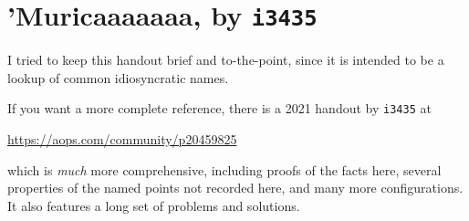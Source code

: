\documentclass[11pt]{scrartcl}
\begin{document}
\section{’Muricaaaaaaa, by \texttt{i3435}}
I tried to keep this handout brief and to-the-point,
since it is intended to be a lookup of common idiosyncratic names.

If you want a more complete reference,
there is a 2021 handout by \texttt{i3435} at
\begin{center}
  \url{https://aops.com/community/p20459825}
\end{center}
which is \emph{much} more comprehensive, including proofs of the facts here,
several properties of the named points not recorded here,
and many more configurations.
It also features a long set of problems and solutions.
\end{document}
